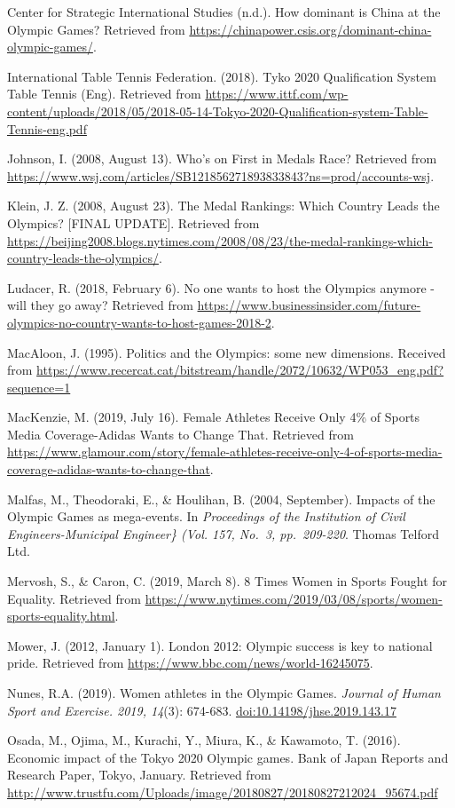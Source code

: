\documentclass[
]{article}
\begin{document}
Center for Strategic International Studies (n.d.). How dominant is China at the Olympic Games? Retrieved from \url{https://chinapower.csis.org/dominant-china-olympic-games/}.

International Table Tennis Federation. (2018). Tyko 2020 Qualification System Table Tennis (Eng). Retrieved from \url{https://www.ittf.com/wp-content/uploads/2018/05/2018-05-14-Tokyo-2020-Qualification-system-Table-Tennis-eng.pdf}

Johnson, I. (2008, August 13). Who's on First in Medals Race? Retrieved from \url{https://www.wsj.com/articles/SB121856271893833843?ns=prod/accounts-wsj}.

Klein, J. Z. (2008, August 23). The Medal Rankings: Which Country Leads the Olympics? {[}FINAL UPDATE{]}. Retrieved from \url{https://beijing2008.blogs.nytimes.com/2008/08/23/the-medal-rankings-which-country-leads-the-olympics/}.

Ludacer, R. (2018, February 6). No one wants to host the Olympics anymore - will they go away? Retrieved from \url{https://www.businessinsider.com/future-olympics-no-country-wants-to-host-games-2018-2}.

MacAloon, J. (1995). Politics and the Olympics: some new dimensions. Received from \url{https://www.recercat.cat/bitstream/handle/2072/10632/WP053_eng.pdf?sequence=1}

MacKenzie, M. (2019, July 16). Female Athletes Receive Only 4\% of Sports Media Coverage-Adidas Wants to Change That. Retrieved from \url{https://www.glamour.com/story/female-athletes-receive-only-4-of-sports-media-coverage-adidas-wants-to-change-that}.

Malfas, M., Theodoraki, E., \& Houlihan, B. (2004, September). Impacts of the Olympic Games as mega-events. In \emph{Proceedings of the Institution of Civil Engineers-Municipal Engineer\} (Vol. 157, No.~3, pp.~209-220}. Thomas Telford Ltd.

Mervosh, S., \& Caron, C. (2019, March 8). 8 Times Women in Sports Fought for Equality. Retrieved from \url{https://www.nytimes.com/2019/03/08/sports/women-sports-equality.html}.

Mower, J. (2012, January 1). London 2012: Olympic success is key to national pride. Retrieved from \url{https://www.bbc.com/news/world-16245075}.

Nunes, R.A. (2019). Women athletes in the Olympic Games. \emph{Journal of Human Sport and Exercise. 2019, 14}(3): 674-683. \url{doi:10.14198/jhse.2019.143.17}

Osada, M., Ojima, M., Kurachi, Y., Miura, K., \& Kawamoto, T. (2016). Economic impact of the Tokyo 2020 Olympic games. Bank of Japan Reports and Research Paper, Tokyo, January. Retrieved from \url{http://www.trustfu.com/Uploads/image/20180827/20180827212024_95674.pdf}
\end{document}
